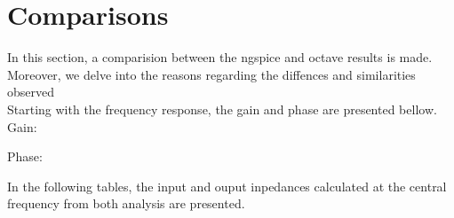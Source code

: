 \section{Comparisons}
\label{sec:comparsisons}

In this section, a comparision between the ngspice and octave results is made. Moreover, we delve into the reasons regarding the diffences and similarities observed\\
Starting with the frequency response, the gain and phase are presented bellow.
Gain:


Phase:


In the following tables, the input and ouput inpedances  calculated at the central frequency from both analysis are presented.
%    

%    



